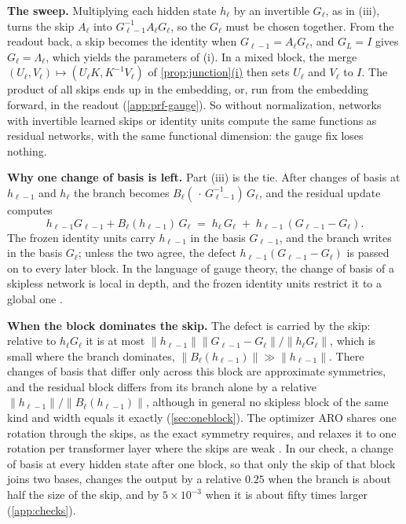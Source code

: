 \documentclass[10pt]{article}
\theoremstyle{definition}
\theoremstyle{remark}
\newcommand{\norm}[1]{\lVert #1\rVert}
\newcommand{\para}[1]{\smallskip\noindent\textbf{#1}\hspace{0.5em}}
\DeclareRobustCommand{\cpref}[2]{\hyperref[#1:#2]{\cref*{#1}(#2)}}
\begin{document}
\para{The sweep.} Multiplying each hidden state $h_\ell$ by an invertible $G_\ell$, as in (iii), turns the skip $A_\ell$ into $G_{\ell-1}^{-1}A_\ell G_\ell$, so the $G_\ell$ must be chosen together. From the readout back, a skip becomes the identity when $G_{\ell-1} = A_\ell G_\ell$, and $G_L = I$ gives $G_\ell = \Lambda_\ell$, which yields the parameters of (i). In a mixed block, the merge $(U_\ell, V_\ell) \mapsto (U_\ell K, K^{-1}V_\ell)$ of \cpref{prop:junction}{i} then sets $U_\ell$ and $V_\ell$ to $I$. The product of all skips ends up in the embedding, or, run from the embedding forward, in the readout (\cref{app:prf-gauge}). So without normalization, networks with invertible learned skips or identity units compute the same functions as residual networks, with the same functional dimension: the gauge fix loses nothing.

\para{Why one change of basis is left.} Part (iii) is the tie. After changes of basis at $h_{\ell-1}$ and $h_\ell$ the branch becomes $B_\ell(\,\cdot\,G_{\ell-1}^{-1})\,G_\ell$, and the residual update computes
\begin{equation}\label{eq:defect}
h_{\ell-1}G_{\ell-1} + B_\ell(h_{\ell-1})\,G_\ell \;=\; h_\ell\,G_\ell \;+\; h_{\ell-1}\,(G_{\ell-1} - G_\ell).
\end{equation}
The frozen identity units carry $h_{\ell-1}$ in the basis $G_{\ell-1}$, and the branch writes in the basis $G_\ell$; unless the two agree, the defect $h_{\ell-1}(G_{\ell-1} - G_\ell)$ is passed on to every later block. In the language of gauge theory, the change of basis of a skipless network is local in depth, and the frozen identity units restrict it to a global one \citep{hashimoto2024unification}.

\para{When the block dominates the skip.} The defect is carried by the skip: relative to $h_\ell G_\ell$ it is at most $\norm{h_{\ell-1}}\norm{G_{\ell-1} - G_\ell}/\norm{h_\ell G_\ell}$, which is small where the branch dominates, $\norm{B_\ell(h_{\ell-1})} \gg \norm{h_{\ell-1}}$. There changes of basis that differ only across this block are approximate symmetries, and the residual block differs from its branch alone by a relative $\norm{h_{\ell-1}}/\norm{B_\ell(h_{\ell-1})}$, although in general no skipless block of the same kind and width equals it exactly (\cref{sec:oneblock}). The optimizer ARO shares one rotation through the skips, as the exact symmetry requires, and relaxes it to one rotation per transformer layer where the skips are weak \citep[Section~6.4]{gong2026aro}. In our check, a change of basis at every hidden state after one block, so that only the skip of that block joins two bases, changes the output by a relative $0.25$ when the branch is about half the size of the skip, and by $5\times10^{-3}$ when it is about fifty times larger (\cref{app:checks}).
\end{document}
